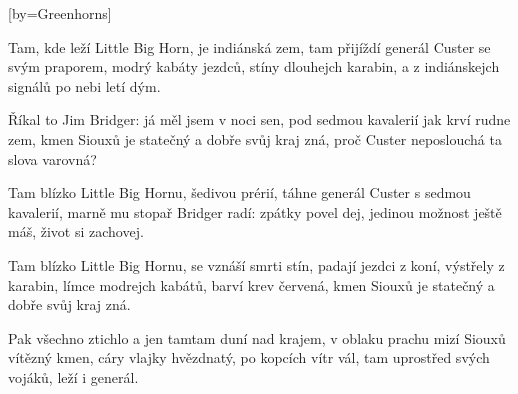 [by={Greenhorns}]

\beginverse{}
Tam, kde leží Little Big Horn, je indiánská zem,
tam přijíždí generál Custer se svým praporem,
modrý kabáty jezdců, stíny dlouhejch karabin,
a z indiánskejch signálů po nebi letí dým.
\endverse{}

\beginchorus{}
Říkal to Jim Bridger: já měl jsem v noci sen,
pod sedmou kavalerií jak krví rudne zem,
kmen Siouxů je statečný a dobře svůj kraj zná,
proč Custer neposlouchá ta slova varovná?
\endchorus{}

\beginverse{}
Tam blízko Little Big Hornu, šedivou prérií,
táhne generál Custer s sedmou kavalerií,
marně mu stopař Bridger radí: zpátky povel dej,
jedinou možnost ještě máš, život si zachovej.
\endverse{}

\beginchorus{}
\phantom{}
\endchorus{}

\beginverse{}
Tam blízko Little Big Hornu, se vznáší smrti stín,
padají jezdci z koní, výstřely z karabin,
límce modrejch kabátů, barví krev červená,
kmen Siouxů je statečný a dobře svůj kraj zná.
\endverse{}

\beginchorus{}
\phantom{}
\endchorus{}

\beginverse{}
Pak všechno ztichlo a jen tamtam duní nad krajem,
v oblaku prachu mizí Siouxů vítězný kmen,
cáry vlajky hvězdnatý, po kopcích vítr vál,
tam uprostřed svých vojáků, leží i generál.
\endverse{}

\beginchorus{}
\phantom{}
\endchorus{}

\endsong{}
